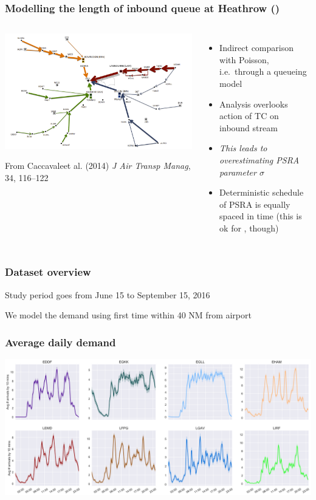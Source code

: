 \documentclass[table,aspectratio=169]{beamer}
\begin{document}
\begin{frame}[t]\frametitle{Modelling the length of inbound queue at Heathrow ()}
    \begin{columns}
        \begin{center}
            \includegraphics[width=.85\textwidth]{cills2}

            {\tiny From Caccavaleet al. (2014) \emph{J Air Transp Manag}, 34, 116--122}
        \end{center}
        \begin{itemize}
            \item Indirect comparison with Poisson, i.e.\ through a queueing model
            \item Analysis overlooks action of TC on inbound stream
            \item \emph{This leads to overestimating PSRA parameter $\sigma$}
            \item Deterministic schedule of PSRA is equally spaced in time (this is ok for , though)
        \end{itemize}
    \end{columns}
\end{frame}

\begin{frame}[t]\frametitle{Dataset overview}
    \centering
    

    \vfill

    \alert{Study period} goes from June 15 to September 15, 2016

    \alert{We model the demand} using first time within 40 NM from airport
\end{frame}

\begin{frame}[t]\frametitle{Average daily demand}
    \centering
    \includegraphics[width=.9\textwidth]{AvgArrivals}
\end{frame}
\end{document}
